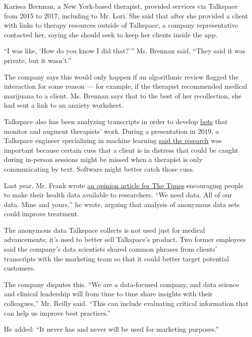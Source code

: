 Karissa Brennan, a New York-based therapist, provided services via
Talkspace from 2015 to 2017, including to Mr. Lori. She said that after
she provided a client with links to therapy resources outside of
Talkspace, a company representative contacted her, saying she should
seek to keep her clients inside the app.

``I was like, `How do you know I did that?''' Ms. Brennan said. ``They
said it was private, but it wasn't.''

The company says this would only happen if an algorithmic review flagged
the interaction for some reason --- for example, if the therapist
recommended medical marijuana to a client. Ms. Brennan says that to the
best of her recollection, she had sent a link to an anxiety worksheet.

Talkspace also has been analyzing transcripts in order to develop
\href{https://news.bloomberglaw.com/privacy-and-data-security/talkspace-wants-to-build-a-better-therapist-with-ai-listening-in}{bots}
that monitor and augment therapists' work. During a presentation in
2019, a Talkspace engineer specializing in machine learning
\href{https://www.youtube.com/watch?v=aq0AhbvxBkc\&feature=emb_logo}{said
the research} was important because certain cues that a client is in
distress that could be caught during in-person sessions might be missed
when a therapist is only communicating by text. Software might better
catch those cues.

Last year, Mr. Frank wrote
\href{https://www.nytimes3xbfgragh.onion/2019/10/02/opinion/health-care-data-privacy.html}{an
opinion article for The Times} encouraging people to make their health
data available to researchers. ``We need data. All of our data. Mine and
yours,'' he wrote, arguing that analysis of anonymous data sets could
improve treatment.

The anonymous data Talkspace collects is not used just for medical
advancements; it's used to better sell Talkspace's product. Two former
employees said the company's data scientists shared common phrases from
clients' transcripts with the marketing team so that it could better
target potential customers.

The company disputes this. ``We are a data-focused company, and data
science and clinical leadership will from time to time share insights
with their colleagues,'' Mr. Reilly said. ``This can include evaluating
critical information that can help us improve best practices.''

He added: ``It never has and never will be used for marketing
purposes.''

